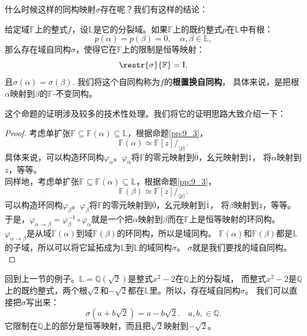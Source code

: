\documentclass[12pt,UTF8,fontset=none]{ctexbook}
\begin{document}
什么时候这样的同构映射$\sigma$存在呢？我们有这样的结论：
\begin{pp}\label{pp:9_7}
    给定域$\mathbb{F}$上的整式$f$，设$\mathbb{L}$是它的分裂域。如果$\mathbb{F}$上的既约整式$p$在$\mathbb{L}$中有根：
    $$ p(\alpha) = p(\beta) = 0, \quad \alpha, \beta \in \mathbb{L}, $$
    那么存在域自同构$\sigma$，使得它在$\mathbb{F}$上的限制是恒等映射：
    $$ \restr{\sigma}{\mathbb{F}} = \mathrm{I}, $$
    且$\sigma(\alpha) = \sigma(\beta).$ 我们将这个自同构称为$f$的\textbf{根置换自同构}，
    具体来说，是把根$\alpha$映射到$\beta$的$\mathbb{F}$-不变同构。
\end{pp}
这个命题的证明涉及较多的技术性处理。我们将它的证明思路大致介绍一下：
\begin{proof} %
    考虑单扩张$\mathbb{F} \subseteq \mathbb{F}(\alpha) \subseteq \mathbb{L}$，根据命题\ref{pp:9_3}，
    $$ \mathbb{F}(\alpha) \simeq \mathbb{F}[z] /_{\langle p \rangle}.$$
    具体来说，可以构造环同构$\varphi_\alpha$。$\varphi_\alpha$将$\mathbb{F}$的零元映射到$\bar{0}$，幺元映射到$\bar{1}$，
    将$\alpha$映射到$\overline{z}$，等等。\\
    同样地，考虑单扩张$\mathbb{F} \subseteq \mathbb{F}(\alpha) \subseteq \mathbb{L}$，根据命题\ref{pp:9_3}，
    $$ \mathbb{F}(\beta) \simeq \mathbb{F}[z] /_{\langle p \rangle}.$$
    可以构造环同构$\varphi_\beta$。$\varphi_\beta$将$\mathbb{F}$的零元映射到$\bar{0}$，幺元映射到$\bar{1}$，
    将$\beta$映射到$\overline{z}$，等等。\\
    于是，$\varphi_{\alpha\rightarrow\beta} = \varphi_\beta^{-1}  \circ \varphi_\alpha$就是一个把$\alpha$映射到$\beta$而在$\mathbb{F}$上是恒等映射的环同构。
    $\varphi_{\alpha\rightarrow\beta}$是从域$\mathbb{F}(\alpha)$到域$\mathbb{F}(\beta)$的环同构，所以是域同构。
    $\mathbb{F}(\alpha)$和$\mathbb{F}(\beta)$都是$\mathbb{L}$的子域，所以可以将它延拓成为$\mathbb{L}$到$\mathbb{L}$的域同构$\sigma$。
    $\sigma$就是我们要找的域自同构。\\
\end{proof}

回到上一节的例子。$\mathbb{L} = \mathbb{Q}(\sqrt{2})$是整式$x^2 - 2$在$\mathbb{Q}$上的分裂域，
而整式$x^2 - 2$是$\mathbb{Q}$上的既约整式，两个根$\sqrt{2}$和$-\sqrt{2}$都在$\mathbb{L}$里。所以，存在域自同构$\sigma$。
我们可以直接把$\sigma$写出来：
$$\sigma (a + b\sqrt{2}) = a - b\sqrt{2}.\quad a, b, \in \mathbb{Q}.$$
它限制在$\mathbb{Q}$上的部分是恒等映射，而且把$\sqrt{2}$映射到$-\sqrt{2}$。
\end{document}
